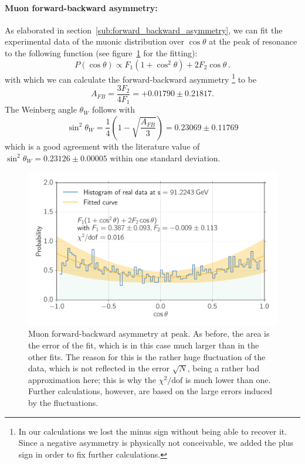 \paragraph{\textbf{Muon forward-backward asymmetry:}}
\label{par:assymetry}
As elaborated in section~\ref{sub:forward_backward_asymmetry},
we can fit the experimental data of the muonic distribution over $\cos\theta$ at the peak of resonance to the following function
(see figure~\ref{fig:asymmetry} for the fitting):
\begin{equation}
    P(\cos\theta) \propto F_1 ( 1+ \cos^2\theta) + 2 F_2 \cos\theta \, .
\end{equation}
with which we can calculate the forward-backward asymmetry%
\footnote{In our calculations we lost the minus sign without being
    able to recover it. Since a negative
asymmetry is physically not conceivable, we added the plus sign in order to fix further calculations.}
to be
\begin{equation}
    A_{FB} = \frac{3 F_2}{4 F_1} = +0.01790 \pm 0.21817.
\end{equation}
The Weinberg angle $\theta_W$ follows with
\begin{equation}
    \sin^2 \theta_W = \frac{1}{4} \left( 1 - \sqrt{ \frac{A_{FB}}{3}} \right)  = 0.23069 \pm 0.11769
\end{equation}
which is a good agreement with the literature value \cite{pdg} of $\sin^2 \theta_W = 0.23126 \pm 0.00005$ within
one standard deviation.


\begin{figure}[htpb]
    \centering
    \includegraphics[width=1.0\linewidth]{figures/assymetry}
    \caption{Muon forward-backward asymmetry at peak. As before, 
        the area is the error of the fit, which is in this case much larger than in
    the other fits. The reason for this is the rather huge fluctuation of the data, which is not reflected in the error 
    $\sqrt{N}$, being a rather bad approximation here; this is why the $\chi^2 / \mathrm{dof}$ is much lower than one.
    Further calculations, however, are based on the large errors induced by the fluctuations.
}
    \label{fig:asymmetry}
\end{figure}

